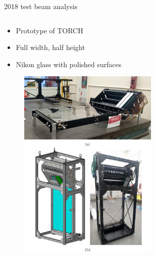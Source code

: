\documentclass[xcolor={dvipsnames}]{beamer}
\begin{document}
\begin{frame}{2018 test beam analysis}
  \begin{columns}
    \begin{column}{0.6\textwidth}
      \begin{itemize}
        \setlength\itemsep{1.0em}
        \item{Prototype of TORCH}
        \item{Full width, half height}
        \item{Nikon glass with polished surfaces}
      \end{itemize}
      \begin{figure}
        \centering
        \includegraphics[width = 0.7\textwidth,trim={0 7.5cm 0 0},clip=true]{Figs/TORCH_testbeam_2018_structure.jpg}
      \end{figure}
    \end{column}
    \begin{column}{0.4\textwidth}
      \begin{figure}
        \centering

\end{figure}
\end{column}
\end{columns}
\end{frame}
\end{document}
